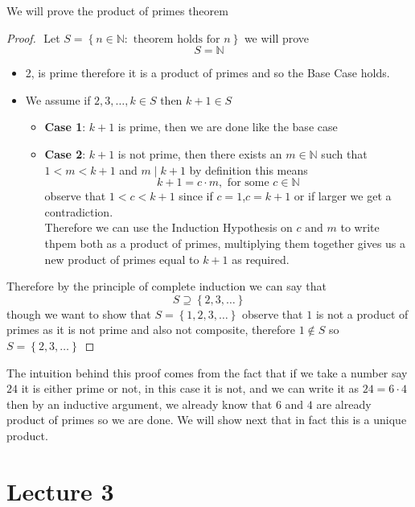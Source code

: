 \documentclass[11pt]{book}
\begin{document}
We will prove the product of primes theorem
\begin{proof}
$ $\newline
    Let $S= \left\{ n \in \mathbb{N} : \text{ theorem holds for } n \right\} $ we will prove 
    \[
    S= \mathbb{N} 
    \]
    \begin{itemize}
        \item 2, is prime therefore it is a product of primes and so the Base Case holds. 
        \item We assume if $2, 3, \ldots , k \in S$ then $k + 1 \in S$ 
            \begin{itemize}
                \item \textbf{Case 1}: $k + 1$ is prime, then we are done like the base case
                \item \textbf{Case 2}: $k + 1$  is not prime, then there exists an $m \in \mathbb{N} $ such that $1 < m < k + 1$ and $m \mid k + 1$ by definition this means 
                    \[
                    k + 1 = c \cdot m, \text{ for some } c \in \mathbb{N} 
                    \]
                    observe that $1 < c < k + 1$ since if $c = 1$,$c= k + 1$ or if larger we get a contradiction.\\
                    Therefore we can use the Induction Hypothesis on $c \text{ and } m$ to write thpem both as a product of primes, multiplying them together gives us a new product of primes equal  to $k + 1$ as required. 
            \end{itemize}
    \end{itemize}
Therefore by the principle of complete induction we can say that 
\[
S \supseteq \left\{ 2, 3, \ldots  \right\} 
\]
though we want to show that $S= \left\{ 1, 2,3, \ldots  \right\} $ observe  that $1$ is not a product of primes as it is not prime and also not composite, therefore $1 \not\in S$ so $S= \left\{ 2, 3, \ldots  \right\} $  
\end{proof}

The intuition behind this proof comes from the fact that if we take a number say $24$ it is either prime  or not, in this case it is not, and we can write it as $24 = 6  \cdot 4$ then by an inductive argument, we already know that $6 $  and $4$ are already product of primes so we are done. We will show next that in fact this is a unique product.



\chapter{Lecture 3}%
\label{chp:lecture_3}
\end{document}
